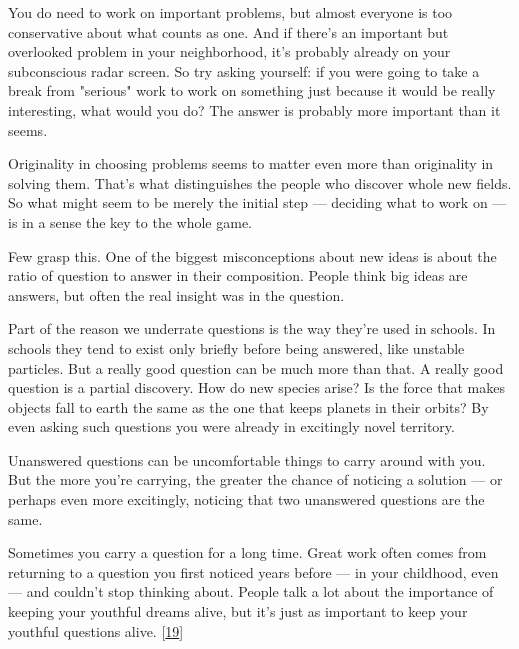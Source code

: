 You
                  do need to work on important problems, but almost everyone is
                  too conservative about what counts as one. And if there's an
                  important but overlooked problem in your neighborhood, it's
                  probably already on your subconscious radar screen. So try
                  asking yourself: if you were going to take a break from
                  "serious" work to work on something just because it would be
                  really interesting, what would you do? The answer is probably
                  more important than it seems.

Originality in
                  choosing problems seems to matter even more than originality
                  in solving them. That's what distinguishes the people who
                  discover whole new fields. So what might seem to be merely the
                  initial step --- deciding what to work on --- is in a
                  sense the key to the whole game.






                  Few grasp this. One of the biggest misconceptions about new
                  ideas is about the ratio of question to answer in their
                  composition. People think big ideas are answers, but often the
                  real insight was in the question.

Part of the
                  reason we underrate questions is the way they're used in
                  schools. In schools they tend to exist only briefly before
                  being answered, like unstable particles. But a really good
                  question can be much more than that. A really good question is
                  a partial discovery. How do new species arise? Is the force
                  that makes objects fall to earth the same as the one that
                  keeps planets in their orbits? By even asking such questions
                  you were already in excitingly novel territory.

Unanswered
                  questions can be uncomfortable things to carry around with
                  you. But the more you're carrying, the greater the chance of
                  noticing a solution --- or perhaps even more excitingly,
                  noticing that two unanswered questions are the same.

Sometimes
                  you carry a question for a long time. Great work often comes
                  from returning to a question you first noticed years before
                  --- in your childhood, even --- and couldn't stop
                  thinking about. People talk a lot about the importance of
                  keeping your youthful dreams alive, but it's just as important
                  to keep your youthful questions alive.
                  [\href{\#f19n}{19}]

